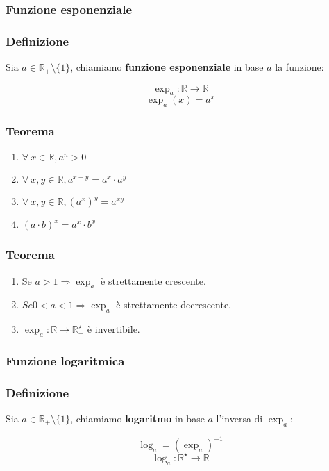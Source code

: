 \subsubsection{Funzione esponenziale}
    \subsubsection*{Definizione}
        Sia $a \in \mathbb{R}_{+} \setminus \{1\}$, chiamiamo \textbf{funzione esponenziale} in base $a$ la funzione:
        \begin{Large}
            \[\exp_{a}: \mathbb{R} \rightarrow \mathbb{R}\] 
            \[\exp_{a}(x) = a^{x}\]
        \end{Large}
    \subsubsection*{Teorema}
        \begin{large}
            \begin{enumerate}
                \item $\forall\ x \in \mathbb{R}, a^{n} > 0$
                \item $\forall\ x,y \in \mathbb{R}, a^{x+y} = a^{x} \cdot a^{y}$
                \item $\forall\ x,y \in \mathbb{R}, {(a^{x})}^{y} = a^{xy}$
                \item ${(a \cdot b)}^{x} = a^{x} \cdot b^{x}$
            \end{enumerate}
        \end{large}
    \subsubsection*{Teorema}
        \begin{enumerate}
            \item Se $a > 1 \Rightarrow \exp_{a}$ è strettamente crescente.
            \item $Se 0 < a < 1 \Rightarrow \exp_{a}$ è strettamente decrescente.
            \item $\exp_{a}: \mathbb{R} \rightarrow \mathbb{R}^{\star}_{+}$ è invertibile.   
        \end{enumerate}
\subsubsection{Funzione logaritmica}
    \subsubsection*{Definizione}
        Sia $a \in \mathbb{R}_{+} \setminus \{1\}$, chiamiamo \textbf{logaritmo} in base $a$ l'inversa di $\exp_{a}$:
        \begin{Large}
        \[
            \log_{a} = {(\exp_{a})}^{-1}    
        \]
        \[
            \log_{a}: \mathbb{R}^{\star} \rightarrow \mathbb{R}    
        \]
        \end{Large}
